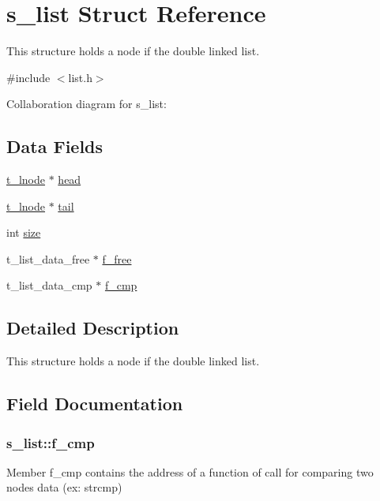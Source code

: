 \hypertarget{structs__list}{}\section{s\+\_\+list Struct Reference}
\label{structs__list}


This structure holds a node if the double linked list.  




{\ttfamily \#include $<$list.\+h$>$}



Collaboration diagram for s\+\_\+list\+:
\subsection*{Data Fields}
\begin{DoxyCompactItemize}
\item 
\hyperlink{structs__lnode}{t\+\_\+lnode} $\ast$ \hyperlink{structs__list_af222b43290e12d08dd57530ebc7f672b}{head}
\item 
\hyperlink{structs__lnode}{t\+\_\+lnode} $\ast$ \hyperlink{structs__list_a34c85ecf7803f11cb86886c9e9967c19}{tail}
\item 
int \hyperlink{structs__list_ac322563dbbb8c1dafd814734cfa689f1}{size}
\item 
t\+\_\+list\+\_\+data\+\_\+free $\ast$ \hyperlink{structs__list_a6a8f9425515ba8a81adb922221ce2e7d}{f\+\_\+free}
\item 
t\+\_\+list\+\_\+data\+\_\+cmp $\ast$ \hyperlink{structs__list_a6e86ceb59adda3831427bede11346dc6}{f\+\_\+cmp}
\end{DoxyCompactItemize}


\subsection{Detailed Description}
This structure holds a node if the double linked list. 

\subsection{Field Documentation}
\hypertarget{structs__list_a6e86ceb59adda3831427bede11346dc6}{}
\subsubsection[{f\+\_\+cmp}]{\setlength{\rightskip}{0pt plus 5cm}s\+\_\+list\+::f\+\_\+cmp}\label{structs__list_a6e86ceb59adda3831427bede11346dc6}
Member \textquotesingle{}f\+\_\+cmp\textquotesingle{} contains the address of a function of call for comparing two nodes\textquotesingle{} \textquotesingle{}data\textquotesingle{} (ex\+: strcmp) \hypertarget{structs__list_a6a8f9425515ba8a81adb922221ce2e7d}{}

